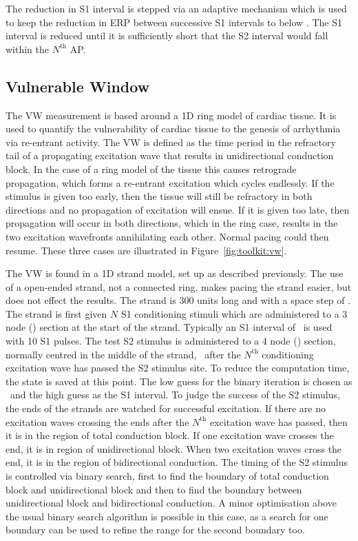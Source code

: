 The reduction in S1 interval is stepped via an adaptive mechanism which is
used to keep the reduction in ERP between successive S1 intervals to below
.  The S1 interval is reduced until it is sufficiently short that the
S2 interval would fall within the $N^{\text{th}}$ AP.

\subsection{Vulnerable Window}

The VW measurement is based around a 1D ring model of cardiac tissue.
It is used to quantify the vulnerability of cardiac tissue to the genesis of
arrhythmia via re-entrant activity.
The VW is defined as the time period in the refractory tail of a propagating
excitation wave that results in unidirectional conduction block.
In the case of a ring model of the tissue this causes retrograde propagation,
which forms a re-entrant excitation which cycles endlessly.
If the stimulus is given too early, then the tissue will still be refractory in
both directions and no propagation of excitation will ensue.
If it is given too late, then propagation will occur in both directions, which
in the ring case, results in the two excitation wavefronts annihilating each
other.
Normal pacing could then resume.
These three cases are illustrated in Figure~\ref{fig:toolkit:vw}.




The VW is found in a 1D strand model, set up as described previously.
The use of a open-ended strand, not a connected ring, makes pacing the strand
easier, but does not effect the results.
The strand is 300 units long and with a space step of .
The strand is first given $N$ S1 conditioning stimuli which are administered to a
3 node () section at the start of the strand.
Typically an S1 interval of \ is used with 10 S1 pulses.
The test S2 stimulus is administered to a 4 node () section, normally
centred in the middle of the strand, \ after the $N^{\text{th}}$
conditioning excitation wave has passed the S2 stimulus site.
To reduce the computation time, the state is saved at this point.
The low guess for the binary iteration is chosen as \ and the high guess
as the S1 interval.
To judge the success of the S2 stimulus, the ends of the strands are watched for
successful excitation.
If there are no excitation waves crossing the ends after the $N^{\text{th}}$
excitation wave has passed, then it is in the region of total conduction block.
If one excitation wave crosses the end, it is in region of unidirectional block.
When two excitation waves cross the end, it is in the region of bidirectional
conduction.
The timing of the S2 stimulus is controlled via binary search, first to find the
boundary of total conduction block and unidirectional block and then to find the
boundary between unidirectional block and bidirectional conduction.
A minor optimisation above the usual binary search algorithm is possible in this
case, as a search for one boundary can be used to refine the range for the
second boundary too.

